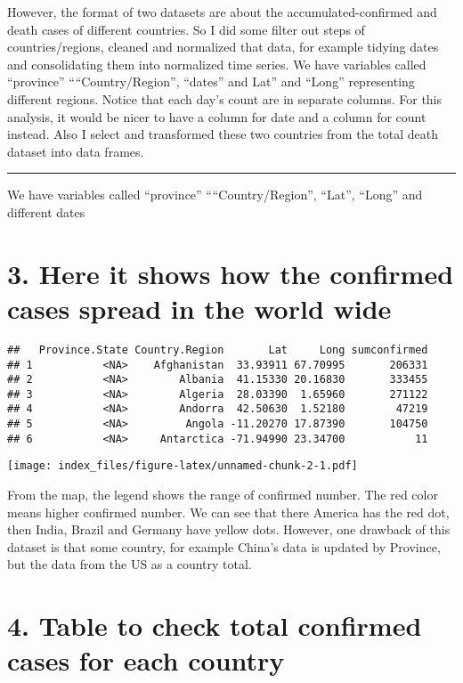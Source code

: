 \documentclass[
]{article}
\begin{document}
However, the format of two datasets are about the accumulated-confirmed
and death cases of different countries. So I did some filter out steps
of countries/regions, cleaned and normalized that data, for example
tidying dates and consolidating them into normalized time series. We
have variables called ``province'' ````Country/Region'', ``dates'' and
Lat'' and ``Long'' representing different regions. Notice that each
day's count are in separate columns. For this analysis, it would be
nicer to have a column for date and a column for count instead. Also I
select and transformed these two countries from the total death dataset
into data frames.

\begin{center}\rule{0.5\linewidth}{0.5pt}\end{center}

We have variables called ``province'' ````Country/Region'', ``Lat'',
``Long'' and different dates

\hypertarget{here-it-shows-how-the-confirmed-cases-spread-in-the-world-wide}{%
\section{3. Here it shows how the confirmed cases spread in the world
wide}\label{here-it-shows-how-the-confirmed-cases-spread-in-the-world-wide}}

\begin{verbatim}
##   Province.State Country.Region       Lat     Long sumconfirmed
## 1           <NA>    Afghanistan  33.93911 67.70995       206331
## 2           <NA>        Albania  41.15330 20.16830       333455
## 3           <NA>        Algeria  28.03390  1.65960       271122
## 4           <NA>        Andorra  42.50630  1.52180        47219
## 5           <NA>         Angola -11.20270 17.87390       104750
## 6           <NA>     Antarctica -71.94990 23.34700           11
\end{verbatim}

\texttt{[image: index\_files/figure-latex/unnamed-chunk-2-1.pdf]}

From the map, the legend shows the range of confirmed number. The red
color means higher confirmed number. We can see that there America has
the red dot, then India, Brazil and Germany have yellow dots. However,
one drawback of this dataset is that some country, for example China's
data is updated by Province, but the data from the US as a country
total.

\hypertarget{table-to-check-total-confirmed-cases-for-each-country}{%
\section{4. Table to check total confirmed cases for each
country}\label{table-to-check-total-confirmed-cases-for-each-country}}
\end{document}
